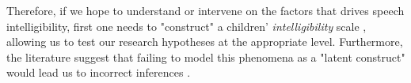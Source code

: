 Therefore, if we hope to understand or intervene on the factors that drives speech intelligibility, first one needs to "construct" a children' \textit{intelligibility} scale \citep{Carroll_2006}, allowing us to test our research hypotheses at the appropriate level. Furthermore, the literature suggest that failing to model this phenomena as a "latent construct" would lead us to incorrect inferences \citep{deHaan_et_al_2019}.

\begin{comment}
			
	If you take a look at the research most of the time these phenomena are not really modelled as characteristics of persons, but as characteristics of smaller units of observation from that person (e.g. utterances; trials; …)
	
	Not approaching these phenomena as a ‘latent construct’ has statistical consequences (this is the crux of the problem; the statistical but also a conceptual problem)
	
	Second, although the literature suggest the number of (un)intelligible words or the entropy of transcriptions are scores that capture the level of intelligibility in a child, it is easy to notice these two can still be considered surrogate measures of it, i.e. scores that indirectly reflect what is intended to be measured. The latter is important because it implies these outcomes are `measured with error', resulting from considering that there is an unobserved (latent) `construct' that is responsible for the observed scores variation, i.e. the \textit{speech intelligibility}. Moreover, it is important to recognize that this `measurement error' is of a different kind that the one produced by the clustered nature of the data, and that again, by failing to account for it, we would be led to incorrect inferences \citep{deHaan_et_al_2019}.
	
	To the authors knowledge, no attempt to create such intelligibility latent 'construct' have been made. Therefore, we believe the literature could benefit from showing how to implement such procedure in a statistical model, in combination with the procedures needed to account for the other nuances in the data. 
	
	Third, even though the literature supplies a myriad of factors that are thought to contribute to the (under)development of intelligible spoken language \citep{Boons_et_al_2012, Gillis_2018, Fagan_et_al_2020, Niparko_et_al_2010}, no transparent framework of analysis is used to determine which factors are relevant, or conforms to valid and actionable causal hypothesis. The lack of such framework not only makes the selection and assessment of relevant factors harder, but also hinders the researcher's ability to avoid facing some common statistical issues related to such selection, e.g. determine which factors can be analyzed in tandem without facing collinearity problems, which ultimately affects our inference capabilities \citep{Farrar_et_al_1967}.
	

\end{comment}
